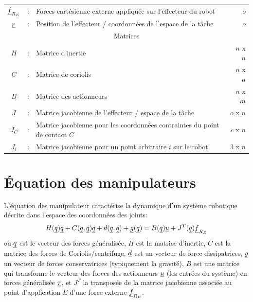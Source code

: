 \begin{table}[H]
\begin{tabular}{ c c l r }
			$\underline{f}_{R_E}$     &  :  & Forces cartésienne externe appliquée sur l'effecteur du robot                  & $o$  \\
			$\underline{r}$       &  :  & Position de l'effecteur / coordonnées de l'espace de la tâche                             & $o$  \\
			\hline \hline
			\multicolumn{4}{c}{Matrices} \\
			\hline \hline
			$H$             &  :  & Matrice d'inertie                                            & $n$ x $n$ \\
			$C$             &  :  & Matrice de coriolis                       & $n$ x $n$ \\
			$B$             &  :  & Matrice des actionneurs                                & $n$ x $m$ \\
			$J$             &  :  & Matrice jacobienne de l'effecteur / espace de la tâche & $o$ x $n$ \\
			$J_C$           &  :  & Matrice jacobienne pour les coordonnées contraintes du point de contact $C$                       & $c$ x $n$  \\
            $J_i$           &  :  & Matrice jacobienne pour un point arbitraire $i$ sur le robot                      & $3$ x $n$  \\
		\hline \hline
        \end{tabular}		
	\label{tab:nom}
\end{table}




\newpage
\section{Équation des manipulateurs}
\label{sec:manipeq}

L'équation des manipulateur caractérise la dynamique d'un système robotique décrite dans l'espace des coordonnées des joints:
\begin{align}
H(\underline{q}) \underline{\ddot{q}} + C(\underline{q},\underline{\dot{q}}) \underline{\dot{q}} + d(\underline{q}, \underline{\dot{q}}) + \underline{g}(\underline{q}) = B(\underline{q}) \underline{u}  + J^T(\underline{q}) \underline{f}_{R_E}
\label{eq:manipulator}
\end{align}
où $\underline{q}$ est le vecteur des forces généralisée, $H$ est la matrice d'inertie, $C$ est la matrice des forces de Coriolis/centrifuge, $\underline{d}$ est un vecteur de force dissipatrices, $\underline{g}$ un vecteur de forces conservatrices (typiquement la gravité), $B$ est une matrice qui transforme le vecteur des forces des actionneurs $\underline{u}$ (les entrées du système) en forces généralisée $\underline{\tau}$, et $J^T$ la transposée de la matrice jacobienne associée au point d'application $E$ d'une force externe $\underline{f}_{R_E}$.


